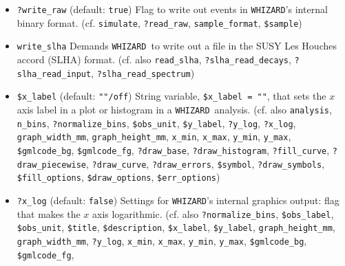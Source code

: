 \documentclass[12pt]{book}
\newcommand{\ttt}[1]{\texttt{#1}}
\newcommand{\whizard}{\texttt{WHIZARD}}
\begin{document}
\begin{itemize}
The \ttt{write\_analysis} statement tells \whizard\ to write the
analysis setup by the user for the SINDARIN input file under
consideration. If no \ttt{\$out\_file} is provided, the histogram
tables/plot data etc. are written to the default file
\ttt{whizard\_analysis.dat}. Note that the related command
\ttt{compile\_analysis} does the same as \ttt{write\_analysis} but in
addition invokes the \whizard\ \LaTeX routines for producing
postscript or PDF output of the data.
(cf. also \ttt{\$out\_file}, \ttt{compile\_analysis})
\item
\ttt{?write\_raw} \qquad (default: \ttt{true}) \newline
Flag to write out events in \whizard's internal binary
format. (cf. \ttt{simulate}, \ttt{?read\_raw}, \ttt{sample\_format},
\ttt{\$sample})
\item
\ttt{write\_slha} \newline
Demands \whizard\ to write out a file in the SUSY Les Houches accord
(SLHA) format. (cf. also \ttt{read\_slha}, \ttt{?slha\_read\_decays},
\ttt{?slha\_read\_input}, \ttt{?slha\_read\_spectrum})
\item
\ttt{\$x\_label} \qquad (default: \ttt{""/off}) \newline
String variable, \ttt{\$x\_label = "{\em <LaTeX code>}"}, that sets the $x$
axis label in a plot or histogram in a \whizard\ analysis. 
(cf. also \ttt{analysis}, 
\ttt{n\_bins}, \ttt{?normalize\_bins}, \ttt{\$obs\_unit},
\ttt{\$y\_label}, \ttt{?y\_log}, \ttt{?x\_log},
\ttt{graph\_width\_mm}, \ttt{graph\_height\_mm}, 
\ttt{x\_min}, \ttt{x\_max}, \ttt{y\_min}, \ttt{y\_max},
\newline \ttt{\$gmlcode\_bg}, \ttt{\$gmlcode\_fg}, \ttt{?draw\_base},
\ttt{?draw\_histogram}, \ttt{?fill\_curve}, \newline \ttt{?draw\_piecewise}, 
\ttt{?draw\_curve}, \ttt{?draw\_errors}, \ttt{\$symbol}, 
\ttt{?draw\_symbols}, \ttt{\$fill\_options}, \ttt{\$draw\_options},
\ttt{\$err\_options})
\item
\ttt{?x\_log} \qquad (default: \ttt{false}) \newline
Settings for \whizard's internal graphics output: flag that
makes the $x$ axis logarithmic. (cf. also
\ttt{?normalize\_bins}, \ttt{\$obs\_label}, \ttt{\$obs\_unit},
\ttt{\$title}, \ttt{\$description}, \ttt{\$x\_label},
\ttt{\$y\_label}, \ttt{graph\_height\_mm}, \ttt{graph\_width\_mm}, 
\ttt{?y\_log}, \ttt{x\_min}, \ttt{x\_max},
\ttt{y\_min}, \ttt{y\_max}, \newline \ttt{\$gmlcode\_bg}, \ttt{\$gmlcode\_fg},

\end{itemize}
\end{document}

